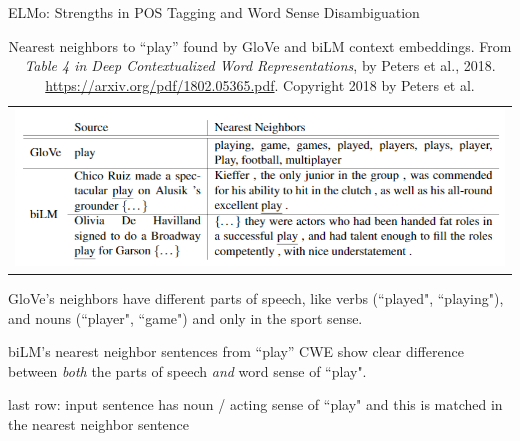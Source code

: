 \begin{frame}{ELMo: Strengths in POS Tagging and Word Sense Disambiguation}
    
    \vspace{10pt}
    
    \begin{table}[ht!]
      \centering
      \begin{tabular}{ c }
        
        \begin{minipage}{.9\textwidth}
          \includegraphics[width=\linewidth]{imgs/table_elmoPlay.png}
        \end{minipage}
      \end{tabular}
      \caption{\linespread{0.3} \scriptsize Nearest neighbors to ``play” found by GloVe and biLM context embeddings. From \emph{Table 4 in Deep Contextualized Word Representations}, by Peters et al., 2018. \url{https://arxiv.org/pdf/1802.05365.pdf}. Copyright 2018 by Peters et al.}
      \label{tbl:elmoPlayExample}
      \vspace{-10pt}
    \end{table}
    
    \vspace{-15pt}
    
    \begin{itemizeSpaced}{5pt}
        
        \pinkbox GloVe's neighbors have different parts of speech, like verbs (``played", ``playing"), and nouns (``player", ``game") and only in the sport sense.
        
        
        \pinkbox biLM's nearest neighbor sentences from ``play'' CWE show clear difference between \emph{both} the parts of speech \emph{and} word sense of ``play". 
        
        \begin{itemizeSpaced}{0pt}
            \pinkbox last row: input sentence has noun / acting sense of ``play" and this is matched in the nearest neighbor sentence
        \end{itemizeSpaced}        
            
    
    \end{itemizeSpaced} 
    
    
\end{frame}